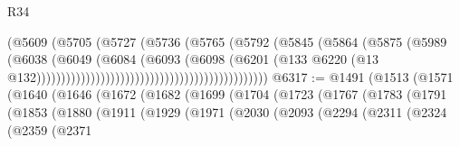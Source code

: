 \begin{lexlean}{R34}
\begin{coremodule}
                                                              (@5609
                                                                (@5705
                                                                  (@5727
                                                                    (@5736
                                                                      (@5765
                                                                        (@5792
                                                                          (@5845
                                                                            (@5864
                                                                              (@5875
                                                                                (@5989
                                                                                  (@6038
                                                                                    (@6049
                                                                                      (@6084
                                                                                        (@6093
                                                                                          (@6098
                                                                                            (@6201
                                                                                              (@133
                                                                                                @6220
                                                                                                (@13
                                                                                                  @132)))))))))))))))))))))))))))))))))))))))))))))))
@6317 := @1491
    (@1513
      (@1571
        (@1640
          (@1646
            (@1672
              (@1682
                (@1699
                  (@1704
                    (@1723
                      (@1767
                        (@1783
                          (@1791
                            (@1853
                              (@1880
                                (@1911
                                  (@1929
                                    (@1971
                                      (@2030
                                        (@2093
                                          (@2294
                                            (@2311
                                              (@2324
                                                (@2359
                                                  (@2371

\end{coremodule}
\end{lexlean}
